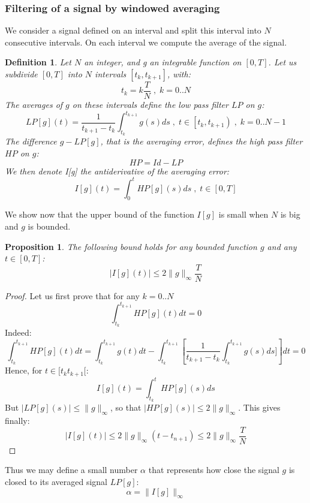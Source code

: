 \documentclass[a4paper,10pt]{article}
\newtheorem{definition}{Definition}
\newtheorem{proposition}{Proposition}
\begin{document}
\subsubsection{Filtering of a signal by windowed averaging}
We consider a signal defined on an interval and split this
interval into $N$ consecutive intervals.  On each interval we compute 
the average of the signal.
\begin{definition}\label{filtering}
Let $N$ an integer, and g an integrable function on $[0,T]$.  
Let us subdivide $[0,T]$ into $N$ intervals $[t_{k},t_{k+1}]$, with:
\begin{equation}
    t_{k}=k\frac{T}{N} \; , \; k = 0..N
    \label{intervals}
\end{equation}
The averages of $g$ on these intervals define the low pass 
filter $LP$ on $g$:
\begin{equation}
     LP[g](t) = \frac{1}{t_{k+1}-t_{k}}\int_{t_{k}}^{t_{k+1}}g(s)ds
     \; , \; t\in \left[t_{k},t_{k+1}\right) \; , \; k=0..N-1
    \label{LdefP}
\end{equation}
The difference $g-LP[g]$, that is the averaging error, defines the high pass filter $HP$ on $g$:
\begin{equation}
    HP=Id-LP
    \label{HPdef}
\end{equation}
We then denote I[g] the antiderivative of the averaging error:
\begin{equation}
    I[g](t)=\int_{0}^{t}HP[g](s)ds \; , \; t\in[0,T]
    \label{defI}
\end{equation}
\end{definition}
We show now that the upper bound of the function $I[g]$ is small when $N$ is big and 
$g$ is bounded.
\begin{proposition}
    The following bound holds for any bounded function $g$ and any 
    $t\in[0,T]$:
   \begin{equation}
    |I[g](t)| \leq 2 \|g\|_{\infty}\frac{T}{N}
    \label{BoundI}
\end{equation} 
\end{proposition}
\begin{proof}
    Let us first prove that for any $k=0..N$ 
 \[ \int_{t_{k}}^{t_{k+1}}HP[g](t)dt = 0 \] 
 Indeed:
\[
         \int_{t_{k}}^{t_{k+1}}HP[g](t)dt  =  \int_{t_{k}}^{t_{k+1}}g(t)dt
            -\int_{t_{k}}^{t_{k+1}}
      \left[\frac{1}{t_{k+1}-t_{k}}\int_{t_{k}}^{t_{k+1}}g(s)ds]\right]dt
        =  0
\]
  Hence, for $t\in[t_{k}t_{k+1}[$:
 \[  I[g](t) = \int_{t_{k}}^{t} HP[g](s)ds\]
 But $|LP[g](s)|\leq \|g\|_{\infty}$, so that $|HP[g](s)|\leq 2 
 \|g\|_{\infty}$.
 This gives finally:
   \[  |I[g](t)|\leq 2 \|g\|_{\infty}(t-t_{n+1}) \leq 2 
    \|g\|_{\infty}\frac{T}{N} \] 
\end{proof}
Thus we may define a small number $\alpha$ that represents how close 
the signal $g$ is closed to its averaged signal $LP[g]$:
\begin{equation}
	\alpha = \|I[g]\|_{\infty}
	\label{alphaSignal}
\end{equation}
\end{document}
